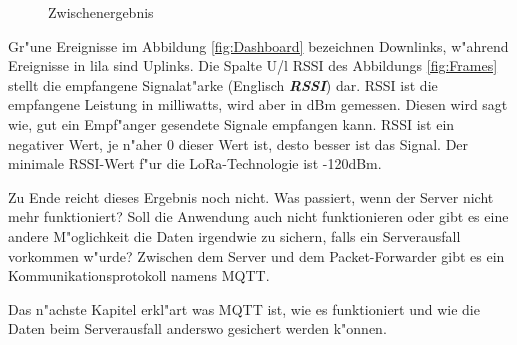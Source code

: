 	\begin{figure}[h!]
	
	\caption{Zwischenergebnis}
\end{figure}

\vspace{10cm}
Gr"une Ereignisse im Abbildung \ref{fig:Dashboard} bezeichnen 
Downlinks, w"ahrend Ereignisse in lila sind Uplinks. Die Spalte U/l 
RSSI des Abbildungs \ref{fig:Frames} stellt die empfangene 
Signalat"arke (Englisch \textbf{\textit{\ac{RSSI}}}) dar. RSSI ist die 
empfangene Leistung in milliwatts, wird aber in \ac{dBm} gemessen. 
Diesen wird sagt wie, gut ein Empf"anger gesendete Signale empfangen 
kann. RSSI ist ein negativer Wert, je n"aher 0 dieser Wert ist, desto 
besser ist das Signal. Der minimale RSSI-Wert f"ur die 
LoRa-Technologie ist -120dBm.  

Zu Ende reicht dieses Ergebnis noch nicht. Was passiert, wenn der Server
nicht mehr funktioniert? Soll die Anwendung auch nicht funktionieren
oder gibt es eine andere M"oglichkeit die Daten irgendwie zu sichern,
falls ein Serverausfall vorkommen w"urde? Zwischen dem Server und dem
Packet-Forwarder gibt es ein Kommunikationsprotokoll namens \ac{MQTT}. 

Das n"achste Kapitel erkl"art was MQTT ist, wie es funktioniert und 
wie die Daten beim Serverausfall anderswo gesichert werden k"onnen. 
  
